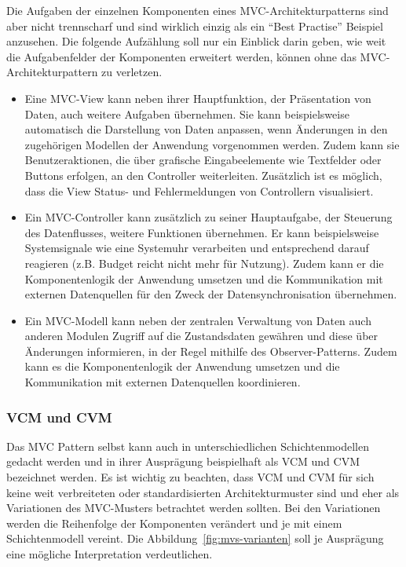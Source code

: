 Die Aufgaben der einzelnen Komponenten eines MVC-Architekturpatterns sind aber nicht trennscharf und sind wirklich einzig als ein \enquote{Best Practise} Beispiel anzusehen. Die folgende Aufzählung soll nur ein Einblick darin geben, wie weit die Aufgabenfelder der Komponenten erweitert werden, können ohne das MVC-Architekturpattern zu verletzen. 
\begin{itemize}
\item Eine MVC-View kann neben ihrer Hauptfunktion, der Präsentation von Daten, auch weitere Aufgaben übernehmen. Sie kann beispielsweise automatisch die Darstellung von Daten anpassen, wenn Änderungen in den zugehörigen Modellen der Anwendung vorgenommen werden. Zudem kann sie Benutzeraktionen, die über grafische Eingabeelemente wie Textfelder oder Buttons erfolgen, an den Controller weiterleiten. Zusätzlich ist es möglich, dass die View Status- und Fehlermeldungen von Controllern visualisiert.

\item Ein MVC-Controller kann zusätzlich zu seiner Hauptaufgabe, der Steuerung des Datenflusses, weitere Funktionen übernehmen. Er kann beispielsweise Systemsignale wie eine Systemuhr verarbeiten und entsprechend darauf reagieren (z.B. Budget reicht nicht mehr für Nutzung). Zudem kann er die Komponentenlogik der Anwendung umsetzen und die Kommunikation mit externen Datenquellen für den Zweck der Datensynchronisation übernehmen.

\item Ein MVC-Modell kann neben der zentralen Verwaltung von Daten auch anderen Modulen Zugriff auf die Zustandsdaten gewähren und diese über Änderungen informieren, in der Regel mithilfe des Observer-Patterns. Zudem kann es die Komponentenlogik der Anwendung umsetzen und die Kommunikation mit externen Datenquellen koordinieren.
\end{itemize}

\subsubsection{VCM und CVM}
Das MVC Pattern selbst kann auch in unterschiedlichen Schichtenmodellen gedacht werden und in ihrer Ausprägung beispielhaft als VCM und CVM bezeichnet werden.  Es ist wichtig zu beachten, dass VCM und CVM für sich keine weit verbreiteten oder standardisierten Architekturmuster sind und eher als Variationen des MVC-Musters betrachtet werden sollten. Bei den Variationen werden die Reihenfolge der Komponenten verändert und je mit einem Schichtenmodell vereint. Die Abbildung~\ref{fig:mvs-varianten} soll je Ausprägung eine mögliche Interpretation verdeutlichen.

